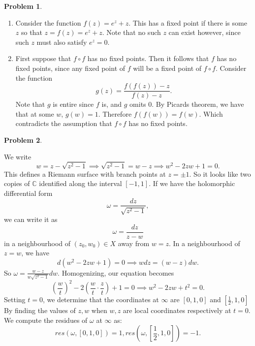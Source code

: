 \documentclass[12pt, a4paper]{article}
\newtheorem{problem}{Problem}
\theoremstyle{definition}
\newcommand{\penum}{ \begin{enumerate}[label=\bf(\alph*), leftmargin=0pt]}
\newcommand{\epenum}{ \end{enumerate} }
\newcommand{\C}{\mathbb{C}}                           %
\begin{document}
\newpage 
\begin{problem}
\end{problem} 
\penum 
\item Consider the function $f(z) = e^{z}+z$. This has a fixed point if there is some $z$ so that $z= f(z)= e^z+z$. Note that no such $z$ can exist however, since such $z$ must also satisfy $e^z=0$.
\item First suppose that $f\circ f$ has no fixed points. Then it follows that $f$ has no fixed points, since any fixed point of $f$ will be a fixed point of $f \circ f$. Consider the function $$g(z) = \frac{f(f(z)) - z}{f(z) - z}.$$ Note that $g$ is entire since $f$ is, and $g$ omits $0$. By Picards theorem, we have that at some $w$, $g(w) =1$. Therefore $f(f(w)) = f(w)$. Which contradicts the assumption that $f\circ f$ has no fixed points. 
\epenum
\newpage
\begin{problem}
\end{problem}
We write $$w = z-\sqrt{z^2-1} \implies \sqrt{z^2-1} = w-z \implies w^2-2zw+1 = 0.$$
This defines a Riemann surface with branch points at $z= \pm1$. So it looks like two copies of $\C$ identified along the interval $[-1,1]$. If we have the holomorphic differential form $$\omega = \frac{dz}{\sqrt{z^2-1}},$$ 
we can write it as $$\omega = \frac{dz}{z-w}$$  in a neighbourhood of $(z_0,w_0)\in X$ away from $w=z$. In a neighbourhood of $z=w$, we have $$d(w^2-2zw +1) = 0 \implies wdz = (w-z)dw.$$ So $\omega = \frac{w-z}{w \sqrt{z^2-1}} dw.$
Homogenizing, our equation becomes $$\left(	\frac{w}{t}\right)^2 -2 \left(\frac{w}{t}\cdot  \frac{z}{t}\right) + 1 = 0 \implies w^2 - 2zw + t^2 = 0.$$
Setting $t=0$, we determine that the coordinates at $\infty$ are $[0,1,0]$ and $[\frac{1}{2}, 1, 0]$ By finding the values of $z,w$ when $w,z$ are local coordinates respectively at $t=0$. We compute the residues of $\omega$ at $\infty$ as: $$res(\omega, [0,1,0]) = 1, res(\omega, [\frac{1}{2} ,1, 0]) = -1.$$
\end{document}
